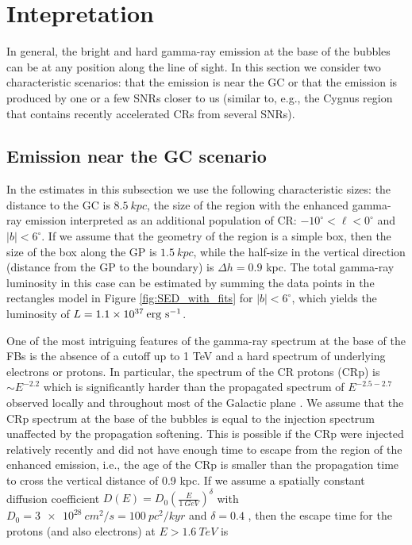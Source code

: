 \section{Intepretation}
\label{sec:Interpretation}

In general, the bright and hard gamma-ray emission at the base of the bubbles can be at any position along the line of sight.
In this section we consider two characteristic scenarios: that the emission is near the GC or that the emission is 
produced by one or a few SNRs closer to us (similar to, e.g., the Cygnus region that contains recently accelerated CRs from several SNRs).

\subsection{Emission near the GC scenario}

In the estimates in this subsection we use the following characteristic sizes: 
the distance to the GC is $\SI{8.5}{kpc}$, 
the size of the region with the enhanced gamma-ray emission interpreted as an additional population of CR:
$-10^\circ < \ell < 0^\circ$ and $|b| < 6^\circ$.
If we assume that the geometry of the region is a simple box, then the size of the box along the GP is $\SI{1.5}{kpc}$,
while the half-size in the vertical direction (distance from the GP to the boundary) is $\Delta h = 0.9$ kpc.
The total gamma-ray luminosity in this case can be estimated 
by summing the data points in the rectangles model in Figure \ref{fig:SED_with_fits}
for $|b| < 6^\circ$, which yields the luminosity of $L = 1.1 \times 10^{37}\:{\rm erg\ s^{-1}}$.

One of the most intriguing features of the gamma-ray spectrum at the base of the FBs is the absence of a cutoff up to 1 TeV and 
a hard spectrum of underlying electrons or protons.
In particular, the spectrum of the CR protons (CRp) is $\sim E^{-2.2}$ which is significantly harder than the propagated spectrum of 
$E^{-2.5 - 2.7}$ observed locally and throughout most of the Galactic plane \citep{2016ApJS..223...26A}.
We assume that the CRp spectrum at the base of the bubbles is equal to the injection spectrum unaffected by the 
propagation softening.
This is possible if the CRp were injected relatively recently and did not have enough time to escape from the region of the enhanced emission,
i.e., the age of the CRp is smaller than the propagation time to cross the vertical distance of 0.9 kpc.
If we assume a spatially constant diffusion coefficient $D(E) = D_0\left(\frac{E}{\SI{1}{GeV}}\right)^\delta$ with 
$D_0 = \SI{3e28}{cm^2/s} = \SI{100}{pc^2/kyr}$ and $\delta = 0.4$ \citep{2007ARNPS..57..285S},
then the escape time for the protons (and also electrons) at $E > \SI{1.6}{TeV}$ is 

